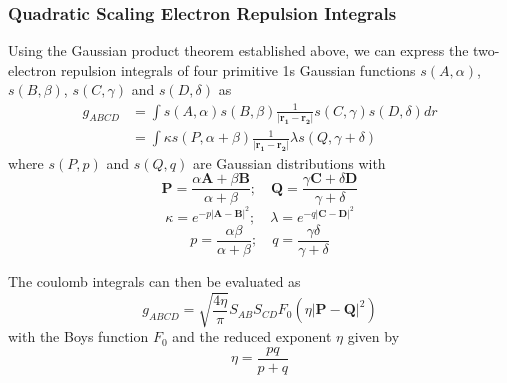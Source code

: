 \subsubsection{Quadratic Scaling Electron Repulsion Integrals} 

Using the Gaussian product theorem established above, we can express the two-electron repulsion integrals of four primitive 1s Gaussian functions $s(A,\alpha)$, $s(B,\beta)$, $s(C,\gamma)$ and $s(D,\delta)$ as
\begin{equation}
\begin{split}
g_{ABCD} &= \int s(A,\alpha) s(B,\beta) \frac{1}{\left\lvert \mathbf{r_1} - \mathbf{r_2} \right\rvert} s(C,\gamma) s(D,\delta) dr \\
&= \int \kappa s(P, \alpha+\beta) \frac{1}{\left\lvert \mathbf{r_1} - \mathbf{r_2} \right\rvert} \lambda s(Q, \gamma+\delta)
\end{split}
\end{equation}
\noindent where $s(P,p)$ and $s(Q,q)$ are Gaussian distributions with
\begin{equation}
\mathbf{P} = \frac{\alpha \mathbf{A} + \beta \mathbf{B}}{\alpha + \beta} ; \quad \mathbf{Q} = \frac{\gamma \mathbf{C} + \delta \mathbf{D}}{\gamma + \delta}
\end{equation}
\begin{equation}
\kappa = e^{-p\left\lvert \mathbf{A} - \mathbf{B} \right\rvert^2} ; \quad \lambda = e^{-q\left\lvert \mathbf{C} - \mathbf{D} \right\rvert^2}
\end{equation}
\begin{equation}
p = \frac{\alpha\beta}{\alpha+\beta}; \quad q = \frac{\gamma\delta}{\gamma+\delta}
\end{equation}

\noindent The coulomb integrals can then be evaluated as 
\begin{equation}
g_{ABCD} = \sqrt{\frac{4 \eta}{\pi}} S_{AB} S_{CD} F_0\left(\eta \left\lvert \mathbf{P} - \mathbf{Q} \right\rvert^2 \right)
\end{equation}
\noindent with the Boys function $F_0$ and the reduced exponent $\eta$ given by
\begin{equation}
\eta = \frac{pq}{p+q}
\end{equation}

